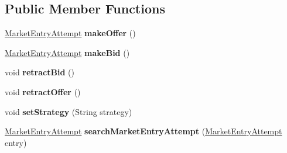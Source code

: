\subsection*{Public Member Functions}
\begin{DoxyCompactItemize}
\item 
\hypertarget{classfinancialmarketsimulator_1_1_market_strategy_a82e5b65bef66ffadea8085e3ca107130}{\hyperlink{classfinancialmarketsimulator_1_1_market_entry_attempt}{Market\+Entry\+Attempt} {\bfseries make\+Offer} ()}\label{classfinancialmarketsimulator_1_1_market_strategy_a82e5b65bef66ffadea8085e3ca107130}

\item 
\hypertarget{classfinancialmarketsimulator_1_1_market_strategy_a2a518f43a8460feab62ef5c31d0e02c9}{\hyperlink{classfinancialmarketsimulator_1_1_market_entry_attempt}{Market\+Entry\+Attempt} {\bfseries make\+Bid} ()}\label{classfinancialmarketsimulator_1_1_market_strategy_a2a518f43a8460feab62ef5c31d0e02c9}

\item 
\hypertarget{classfinancialmarketsimulator_1_1_market_strategy_ab7bbd10cab2e86f3c48c81bbb4c058e2}{void {\bfseries retract\+Bid} ()}\label{classfinancialmarketsimulator_1_1_market_strategy_ab7bbd10cab2e86f3c48c81bbb4c058e2}

\item 
\hypertarget{classfinancialmarketsimulator_1_1_market_strategy_aa3e0b344b5025ab9aa4a36df70b48ec3}{void {\bfseries retract\+Offer} ()}\label{classfinancialmarketsimulator_1_1_market_strategy_aa3e0b344b5025ab9aa4a36df70b48ec3}

\item 
\hypertarget{classfinancialmarketsimulator_1_1_market_strategy_ae65923e56266106ecb5b4b7f89a4e70b}{void {\bfseries set\+Strategy} (String strategy)}\label{classfinancialmarketsimulator_1_1_market_strategy_ae65923e56266106ecb5b4b7f89a4e70b}

\item 
\hypertarget{classfinancialmarketsimulator_1_1_market_strategy_ac773269f4e29a7b1099b3495d1781823}{\hyperlink{classfinancialmarketsimulator_1_1_market_entry_attempt}{Market\+Entry\+Attempt} {\bfseries search\+Market\+Entry\+Attempt} (\hyperlink{classfinancialmarketsimulator_1_1_market_entry_attempt}{Market\+Entry\+Attempt} entry)}\label{classfinancialmarketsimulator_1_1_market_strategy_ac773269f4e29a7b1099b3495d1781823}

\end{DoxyCompactItemize}



